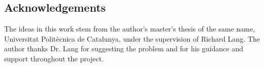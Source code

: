 \subsection*{Acknowledgements}

The ideas in this work stem from the author's master's thesis of the same name,
Universitat Polit\`{e}cnica de Catalunya,
under the supervision of Richard Lang.
The author thanks Dr. Lang for suggesting the problem and for his guidance and support throughout the project.

